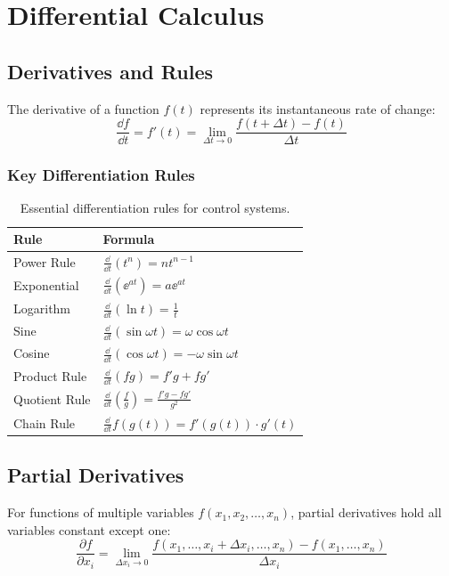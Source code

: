 \section{Differential Calculus}

\subsection{Derivatives and Rules}

The derivative of a function $f(t)$ represents its instantaneous rate of change:
\begin{equation}
\frac{\dd f}{\dd t} = f'(t) = \lim_{\Delta t \to 0} \frac{f(t + \Delta t) - f(t)}{\Delta t}
\end{equation}

\subsubsection{Key Differentiation Rules}

\begin{table}[htbp]
\centering
\begin{tabular}{ll}
\toprule
\textbf{Rule} & \textbf{Formula} \\
\midrule
Power Rule & $\frac{\dd}{\dd t}(t^n) = n t^{n-1}$ \\
Exponential & $\frac{\dd}{\dd t}(\ee^{at}) = a\ee^{at}$ \\
Logarithm & $\frac{\dd}{\dd t}(\ln t) = \frac{1}{t}$ \\
Sine & $\frac{\dd}{\dd t}(\sin\omega t) = \omega\cos\omega t$ \\
Cosine & $\frac{\dd}{\dd t}(\cos\omega t) = -\omega\sin\omega t$ \\
Product Rule & $\frac{\dd}{\dd t}(fg) = f'g + fg'$ \\
Quotient Rule & $\frac{\dd}{\dd t}\left(\frac{f}{g}\right) = \frac{f'g - fg'}{g^2}$ \\
Chain Rule & $\frac{\dd}{\dd t}f(g(t)) = f'(g(t)) \cdot g'(t)$ \\
\bottomrule
\end{tabular}
\caption{Essential differentiation rules for control systems.}
\label{tab:diff_rules}
\end{table}

\subsection{Partial Derivatives}

For functions of multiple variables $f(x_1, x_2, \ldots, x_n)$, partial derivatives hold all variables constant except one:
\begin{equation}
\frac{\partial f}{\partial x_i} = \lim_{\Delta x_i \to 0} \frac{f(x_1, \ldots, x_i + \Delta x_i, \ldots, x_n) - f(x_1, \ldots, x_n)}{\Delta x_i}
\end{equation}

